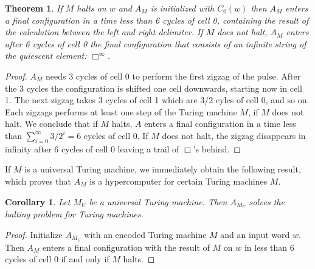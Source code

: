 \documentclass[pre,showpacs,showkeys,preprint]{revtex4}
\newtheorem{theorem}{Theorem}
\newtheorem{cor}{Corollary}
\theoremstyle{definition}
\begin{document}
\begin{theorem}
\label{th-rca}
If $M$ halts on $w$ and $A_M$ is initialized with $C_0(w)$ then $A_M$ enters a final
configuration in a time less than 6 cycles of cell 0, containing the result of the calculation between the left
and right delimiter.
If $M$ does not halt, $A_M$ enters after 6 cycles of cell 0 the final configuration that consists
of an infinite string of the quiescent element: $\Box^\infty$.
\end{theorem}
\begin{proof}
$A_M$ needs 3 cycles of cell 0 to perform the first zigzag of the pulse.
After the 3 cycles the configuration is shifted one cell downwards, starting now in cell 1.
The next zigzag takes 3 cycles of cell 1 which are 3/2 cyles of cell 0, and so on.
Each zigzags performs at least one step of the Turing machine $M$, if $M$ does not halt.
We conclude that if $M$ halts, $A$ enters a final configuration in a time less than
$\sum_{i=0}^\infty 3/2^{i} = 6$ cycles of cell 0.
If $M$ does not halt, the zigzag disappears in infinity after 6 cycles of cell 0 leaving a trail of $\Box$'s behind.
\end{proof}

If $M$ is a universal Turing machine, we immediately obtain the following result, which proves that $A_M$ is a hypercomputer
for certain Turing machines $M$.
\begin{cor}
Let $M_U$ be a universal Turing machine. Then $A_{M_U}$ solves the halting problem for Turing machines.
\end{cor}
\begin{proof}
Initialize $A_{M_U}$ with an encoded Turing machine $M$ and an input word $w$.
Then $A_M$ enters a final configuration with the result of $M$ on $w$ in less than 6 cycles of cell 0 if and only if $M$ halts.
\end{proof}
\end{document}
